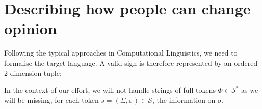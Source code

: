 
\section{Describing how people can change opinion}
\label{sec:opinionca}

Following the typical approaches in Computational Linguistics, we need to formalise the target language.
A valid sign is therefore represented by an ordered 2-dimension tuple:

In the context of our effort, we will not handle strings of full tokens $\Phi \in \mathcal{S}^\ast$ as we will
be missing, for each token $s = (\Sigma, \sigma) \in \mathcal{S}$, the information on $\sigma$.
